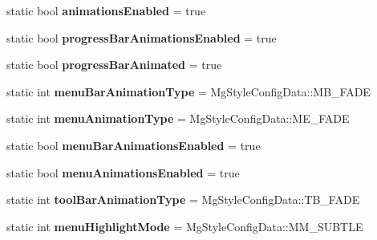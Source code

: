 \begin{DoxyCompactItemize}
\item 
\mbox{\label{struct_mg_style_config_data_a2a96be174910a9ef8afcf613d87e6b2b}} 
static bool {\bfseries animations\+Enabled} = true
\item 
\mbox{\label{struct_mg_style_config_data_a58f051f6d1dc4257087fe46afa5996f3}} 
static bool {\bfseries progress\+Bar\+Animations\+Enabled} = true
\item 
\mbox{\label{struct_mg_style_config_data_a55566537ec15f55569f52ce5bfa519f7}} 
static bool {\bfseries progress\+Bar\+Animated} = true
\item 
\mbox{\label{struct_mg_style_config_data_aaa3e3e2bbea43916c477c21444dd16a4}} 
static int {\bfseries menu\+Bar\+Animation\+Type} = Mg\+Style\+Config\+Data\+::\+M\+B\+\_\+\+F\+A\+DE
\item 
\mbox{\label{struct_mg_style_config_data_a6369b823581e074d1482121052a97eb1}} 
static int {\bfseries menu\+Animation\+Type} = Mg\+Style\+Config\+Data\+::\+M\+E\+\_\+\+F\+A\+DE
\item 
\mbox{\label{struct_mg_style_config_data_acd56eb3ee2de63512a2acbc8b7709dca}} 
static bool {\bfseries menu\+Bar\+Animations\+Enabled} = true
\item 
\mbox{\label{struct_mg_style_config_data_aa1e110a33720faec464f7f01116485ec}} 
static bool {\bfseries menu\+Animations\+Enabled} = true
\item 
\mbox{\label{struct_mg_style_config_data_a1540f1f8f7088d31b8c5f71921e38bad}} 
static int {\bfseries tool\+Bar\+Animation\+Type} = Mg\+Style\+Config\+Data\+::\+T\+B\+\_\+\+F\+A\+DE
\item 
\mbox{\label{struct_mg_style_config_data_a6fbae88f4b4ac6dc959b669dd6ae14f3}} 
static int {\bfseries menu\+Highlight\+Mode} = Mg\+Style\+Config\+Data\+::\+M\+M\+\_\+\+S\+U\+B\+T\+LE
\item 
\mbox{\label{struct_mg_style_config_data_ab0de556e839a6db10ebe7fa1dc945831}} 

\end{DoxyCompactItemize}

